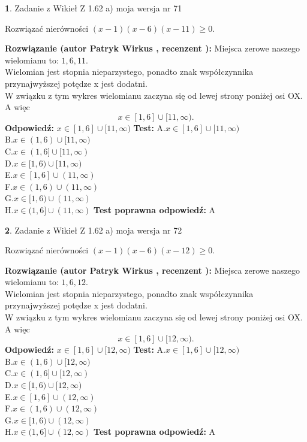 \documentclass[12pt, a4paper]{article}
\theoremstyle{definition} %
\newtheorem{zad}{}
\newcommand{\zadStart}[1]{\begin{zad}#1\newline}
\newcommand{\zadStop}{\end{zad}}
\newcommand{\rozwStart}[2]{\noindent \textbf{Rozwiązanie (autor #1 , recenzent #2): }\newline}
\newcommand{\rozwStop}{\newline}
\newcommand{\odpStart}{\noindent \textbf{Odpowiedź:}\newline}
\newcommand{\odpStop}{\newline}
\newcommand{\testStart}{\noindent \textbf{Test:}\newline}
\newcommand{\testStop}{\newline}
\newcommand{\kluczStart}{\noindent \textbf{Test poprawna odpowiedź:}\newline}
\newcommand{\kluczStop}{\newline}
\begin{document}
\zadStart{Zadanie z Wikieł Z 1.62 a) moja wersja nr 71}

Rozwiązać nierówności $(x-1)(x-6)(x-11)\ge0$.
\zadStop
\rozwStart{Patryk Wirkus}{}
Miejsca zerowe naszego wielomianu to: $1, 6, 11$.\\
Wielomian jest stopnia nieparzystego, ponadto znak współczynnika przy\linebreak najwyższej potędze x jest dodatni.\\ W związku z tym wykres wielomianu zaczyna się od lewej strony poniżej osi OX. A więc $$x \in [1,6] \cup [11,\infty).$$
\rozwStop
\odpStart
$x \in [1,6] \cup [11,\infty)$
\odpStop
\testStart
A.$x \in [1,6] \cup [11,\infty)$\\
B.$x \in (1,6) \cup [11,\infty)$\\
C.$x \in (1,6] \cup [11,\infty)$\\
D.$x \in [1,6) \cup [11,\infty)$\\
E.$x \in [1,6] \cup (11,\infty)$\\
F.$x \in (1,6) \cup (11,\infty)$\\
G.$x \in [1,6) \cup (11,\infty)$\\
H.$x \in (1,6] \cup (11,\infty)$
\testStop
\kluczStart
A
\kluczStop



\zadStart{Zadanie z Wikieł Z 1.62 a) moja wersja nr 72}

Rozwiązać nierówności $(x-1)(x-6)(x-12)\ge0$.
\zadStop
\rozwStart{Patryk Wirkus}{}
Miejsca zerowe naszego wielomianu to: $1, 6, 12$.\\
Wielomian jest stopnia nieparzystego, ponadto znak współczynnika przy\linebreak najwyższej potędze x jest dodatni.\\ W związku z tym wykres wielomianu zaczyna się od lewej strony poniżej osi OX. A więc $$x \in [1,6] \cup [12,\infty).$$
\rozwStop
\odpStart
$x \in [1,6] \cup [12,\infty)$
\odpStop
\testStart
A.$x \in [1,6] \cup [12,\infty)$\\
B.$x \in (1,6) \cup [12,\infty)$\\
C.$x \in (1,6] \cup [12,\infty)$\\
D.$x \in [1,6) \cup [12,\infty)$\\
E.$x \in [1,6] \cup (12,\infty)$\\
F.$x \in (1,6) \cup (12,\infty)$\\
G.$x \in [1,6) \cup (12,\infty)$\\
H.$x \in (1,6] \cup (12,\infty)$
\testStop
\kluczStart
A
\kluczStop
\end{document}

